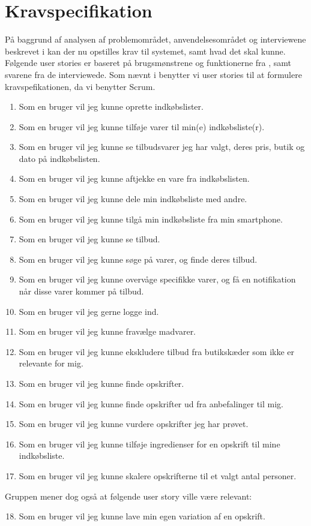 \section{Kravspecifikation}\label{sec:krav}

På baggrund af analysen af problemområdet, anvendelsesområdet og interviewene beskrevet i   kan der nu opstilles krav til systemet, samt hvad det skal kunne.
Følgende user stories er baseret på brugsmønstrene og funktionerne fra , samt svarene fra de interviewede.
Som nævnt i  benytter vi user stories til at formulere kravspefikationen, da vi benytter Scrum.
\begin{enumerate}
	\item Som en bruger vil jeg kunne oprette indkøbslister.
	\item Som en bruger vil jeg kunne tilføje varer til min(e) indkøbsliste(r).
	\item Som en bruger vil jeg kunne se tilbudsvarer jeg har valgt, deres pris, butik og dato på indkøbslisten.
	\item Som en bruger vil jeg kunne aftjekke en vare fra indkøbslisten.
	\item Som en bruger vil jeg kunne dele min indkøbsliste med andre.
	\item Som en bruger vil jeg kunne tilgå min indkøbsliste fra min smartphone.
			
	\item Som en bruger vil jeg kunne se tilbud.
	\item Som en bruger vil jeg kunne søge på varer, og finde deres tilbud. 
	
	\item Som en bruger vil jeg kunne overvåge specifikke varer, og få en notifikation når disse varer kommer på tilbud.
	
	\item Som en bruger vil jeg gerne logge ind.
	\item Som en bruger vil jeg kunne fravælge madvarer.
	\item Som en bruger vil jeg kunne ekskludere tilbud fra butikskæder som ikke er relevante for mig.
	
	\item Som en bruger vil jeg kunne finde opskrifter.
	\item Som en bruger vil jeg kunne finde opskrifter ud fra anbefalinger til mig.
	\item Som en bruger vil jeg kunne vurdere opskrifter jeg har prøvet.
	\item Som en bruger vil jeg kunne tilføje ingredienser for en opskrift til mine indkøbsliste.
	\item Som en bruger vil jeg kunne skalere opskrifterne til et valgt antal personer.
\end{enumerate}
Gruppen mener dog også at følgende user story ville være relevant: 
\begin{enumerate}
\setcounter{enumi}{17}
	\item Som en bruger vil jeg kunne lave min egen variation af en opskrift.
\end{enumerate}

